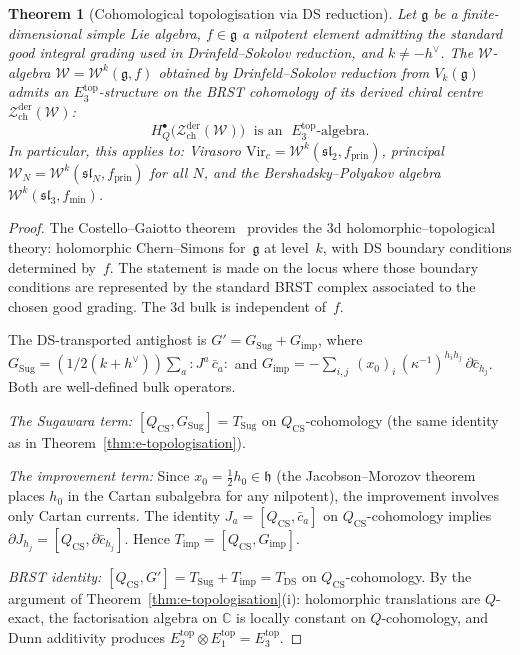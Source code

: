 \documentclass[11pt,reqno]{amsart}
\newtheorem{theorem}{Theorem}[section]
\theoremstyle{definition}
\theoremstyle{remark}
\providecommand{\cW}{\mathcal{W}}
\providecommand{\cZ}{\mathcal{Z}}
\providecommand{\fg}{\mathfrak{g}}
\providecommand{\fh}{\mathfrak{h}}
\providecommand{\Eone}{E_1}
\providecommand{\Etwo}{E_2}
\providecommand{\Ethree}{E_3}
\providecommand{\bC}{\mathbb{C}}
\begin{document}
\begin{theorem}[Cohomological topologisation via DS reduction]
\label{thm:e-topologisation-DS}
Let $\fg$ be a finite-dimensional simple Lie algebra,
$f \in \fg$ a nilpotent element admitting the standard good integral
grading used in Drinfeld--Sokolov reduction, and $k \neq -h^\vee$.
The $\cW$-algebra $\cW = \cW^k(\fg, f)$ obtained by
Drinfeld--Sokolov reduction from $V_k(\fg)$ admits an
$\Ethree^{\mathrm{top}}$-structure on the BRST cohomology of
its derived chiral centre
$\cZ^{\mathrm{der}}_{\mathrm{ch}}(\cW)$:
\begin{equation}\label{eq:e-DS-topologisation}
H_Q^\bullet\bigl(
\cZ^{\mathrm{der}}_{\mathrm{ch}}(\cW)\bigr)
\;\text{ is an }\;
\Ethree^{\mathrm{top}}\text{-algebra.}
\end{equation}
In particular, this applies to: Virasoro
$\mathrm{Vir}_c = \cW^k(\mathfrak{sl}_2, f_{\mathrm{prin}})$,
principal $\cW_N = \cW^k(\mathfrak{sl}_N, f_{\mathrm{prin}})$
for all $N$, and the Bershadsky--Polyakov algebra
$\cW^k(\mathfrak{sl}_3, f_{\min})$.
\end{theorem}

\begin{proof}
The Costello--Gaiotto theorem~\cite{CostelloGaiotto} provides the
$3$d holomorphic--topological theory: holomorphic Chern--Simons
for~$\fg$ at level~$k$, with DS boundary conditions determined
by~$f$. The statement is made on the locus where those boundary
conditions are represented by the standard BRST complex associated
to the chosen good grading. The $3$d bulk is independent of~$f$.

The DS-transported antighost is
$G' = G_{\mathrm{Sug}} + G_{\mathrm{imp}}$, where
$G_{\mathrm{Sug}} = (1/2(k+h^\vee))\sum_a {:}J^a\,\bar c_a{:}$
and
$G_{\mathrm{imp}} =
-\sum_{i,j}\,(x_0)_i\,
(\kappa^{-1})^{h_i h_j}\,\partial\bar c_{h_j}$.
Both are well-defined bulk operators.

\emph{The Sugawara term:}
$[Q_{\mathrm{CS}}, G_{\mathrm{Sug}}] = T_{\mathrm{Sug}}$
on $Q_{\mathrm{CS}}$-cohomology
(the same identity as in
Theorem~\ref{thm:e-topologisation}).

\emph{The improvement term:}
Since $x_0 = \tfrac{1}{2}h_0 \in \fh$
(the Jacobson--Morozov theorem places $h_0$ in the Cartan
subalgebra for any nilpotent), the improvement involves
only Cartan currents.
The identity $J_a = [Q_{\mathrm{CS}}, \bar c_a]$ on
$Q_{\mathrm{CS}}$-cohomology implies
$\partial J_{h_j} = [Q_{\mathrm{CS}}, \partial\bar c_{h_j}]$.
Hence
$T_{\mathrm{imp}} = [Q_{\mathrm{CS}}, G_{\mathrm{imp}}]$.

\emph{BRST identity:}
$[Q_{\mathrm{CS}}, G'] = T_{\mathrm{Sug}} + T_{\mathrm{imp}}
= T_{\mathrm{DS}}$ on $Q_{\mathrm{CS}}$-cohomology.
By the argument of Theorem~\ref{thm:e-topologisation}(i):
holomorphic translations are $Q$-exact, the factorisation
algebra on $\bC$ is locally constant on $Q$-cohomology, and
Dunn additivity produces
$\Etwo^{\mathrm{top}} \otimes \Eone^{\mathrm{top}} =
\Ethree^{\mathrm{top}}$.
\end{proof}
\end{document}
